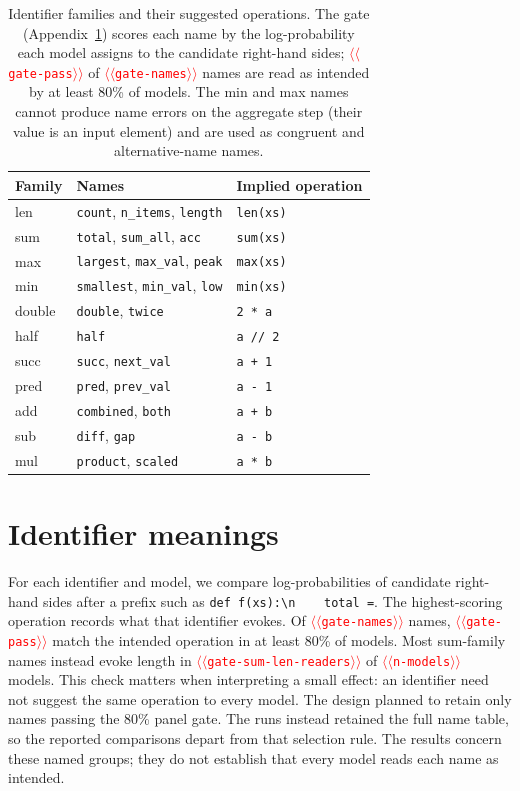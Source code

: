 \documentclass[11pt]{article}
\providecommand{\NUM}[1]{\textcolor{red}{$\langle\langle$\texttt{#1}$\rangle\rangle$}}
\begin{document}
\begin{table}[t]
\centering\small
\begin{tabular}{@{}lll@{}}
\toprule
Family & Names & Implied operation \\
\midrule
len & \texttt{count}, \texttt{n\_items}, \texttt{length} & \texttt{len(xs)} \\
sum & \texttt{total}, \texttt{sum\_all}, \texttt{acc} & \texttt{sum(xs)} \\
max & \texttt{largest}, \texttt{max\_val}, \texttt{peak} & \texttt{max(xs)} \\
min & \texttt{smallest}, \texttt{min\_val}, \texttt{low} & \texttt{min(xs)} \\
double & \texttt{double}, \texttt{twice} & \texttt{2 * a} \\
half & \texttt{half} & \texttt{a // 2} \\
succ & \texttt{succ}, \texttt{next\_val} & \texttt{a + 1} \\
pred & \texttt{pred}, \texttt{prev\_val} & \texttt{a - 1} \\
add & \texttt{combined}, \texttt{both} & \texttt{a + b} \\
sub & \texttt{diff}, \texttt{gap} & \texttt{a - b} \\
mul & \texttt{product}, \texttt{scaled} & \texttt{a * b} \\
\bottomrule
\end{tabular}
\caption{Identifier families and their suggested operations. The gate (Appendix~\ref{app:gate}) scores each name by the log-probability each
model assigns to the candidate right-hand sides; \NUM{gate-pass} of \NUM{gate-names} names are
read as intended by at least 80\% of models. The min and max names cannot produce name errors on the
aggregate step (their value is an input element) and are used as congruent and
alternative-name names.}
\label{tab:gate}
\end{table}

\section{Identifier meanings}
\label{app:gate}
For each identifier and model, we compare log-probabilities of candidate right-hand sides after
a prefix such as \texttt{def f(xs):\textbackslash n\ \ \ \ total =}.
The highest-scoring operation records what that identifier evokes. Of \NUM{gate-names} names,
\NUM{gate-pass} match the intended operation in at least 80\% of models. Most sum-family names
instead evoke length in \NUM{gate-sum-len-readers} of \NUM{n-models} models. This check matters
when interpreting a small effect: an identifier need not suggest the same operation to every model.
The design planned to retain only names passing the 80\% panel gate. The runs instead retained
the full name table, so the reported comparisons depart from that selection rule. The results
concern these named groups; they do not establish that every model reads each name as intended.
\end{document}
